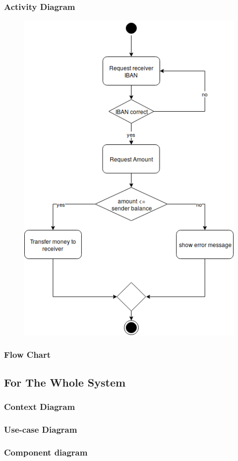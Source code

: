 \documentclass{article}
\begin{document}
		\newpage\subsubsection{Activity Diagram}
		\begin{figure}[h!]
			\begin{center}
				\includegraphics[height=\linewidth]{img/transfer_activity.png}
			\end{center}
		\end{figure}

		\newpage\subsubsection{Flow Chart}

	\newpage\subsection{For The Whole System}
	\subsubsection{Context Diagram}	
	\subsubsection{Use-case Diagram}
	\subsubsection{Component diagram}
\end{document}
